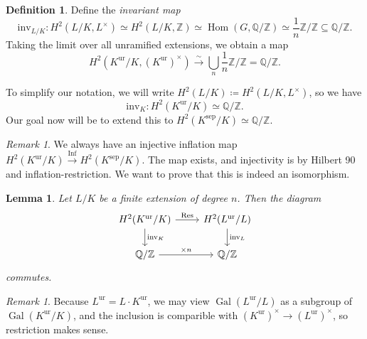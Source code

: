 \documentclass[leqno, openany]{memoir}
\newtheorem{lem}[thm]{Lemma}
\theoremstyle{definition}
\newtheorem{defn}[thm]{Definition}
\theoremstyle{remark}
\newtheorem{rmk}[thm]{Remark}
\theoremstyle{plain}
\theoremstyle{definition}
\theoremstyle{remark}
\newcommand{\Z}{\mathbb{Z}}
\newcommand{\Q}{\mathbb{Q}}
\newcommand{\mr}[1]{\mathrm{#1}}
\DeclareMathOperator{\Hom}{Hom}
\DeclareMathOperator{\Gal}{Gal}
\DeclareMathOperator{\Inf}{Inf}
\begin{document}
\begin{defn} Define the \textit{invariant map} \[ \mr{inv}_{L/K} \colon H^2(L
/K, L^{\times}) \simeq H^2(L/K, \Z) \simeq \Hom(G, \Q/\Z) \simeq \frac{1}{n} \Z
/ \Z \subseteq \Q/\Z. \] Taking the limit over all unramified extensions, we
obtain a map \[ H^2(K^{\mr{ur}}/K, {(K^{\mr{ur}})}^{\times}) \xrightarrow{\sim}
\bigcup_n \frac{1}{n} \Z / \Z = \Q/\Z. \] \end{defn}

To simplify our notation, we will write $H^2(L/K) \coloneqq H^2(L/K,
L^{\times})$, so we have \[ \mr{inv}_K \colon H^2(K^{\mr{ur}}/K) \simeq \Q/\Z.
\] Our goal now will be to extend this to $H^2(K^{\mr{sep}}/K) \simeq \Q/\Z$.

\begin{rmk} We always have an injective inflation map $H^2(K^{\mr{ur}}/K)
    \xrightarrow{\Inf} H^2(K^{\mr{sep}}/K)$. The map exists, and injectivity is
    by Hilbert 90 and inflation-restriction. We want to prove that this is
    indeed an isomorphism.  \end{rmk}

\begin{lem} Let $L/K$ be a finite extension of degree $n$. Then the diagram
    \begin{equation*} \begin{tikzcd} H^2(K^{\mr{ur}}/K) \ar{d}{\mr{inv}_K}
    \ar{r}{\Res} & H^2(L^{\mr{ur}}/L) \ar{d}{\mr{inv}_L} \\ \Q/\Z \ar{r}{\times
n} & \Q/\Z \end{tikzcd} \end{equation*} commutes.  \end{lem}

\begin{rmk} Because $L^{\mr{ur}} = L \cdot K^{\mr{ur}}$, we may view
    $\Gal(L^{\mr{ur}}/L)$ as a subgroup of $\Gal(K^{\mr{ur}}/K)$, and the
    inclusion is comparible with ${(K^{\mr{ur}})}^{\times} \to
    {(L^{\mr{ur}})}^{\times}$, so restriction makes sense.  \end{rmk}
\end{document}
